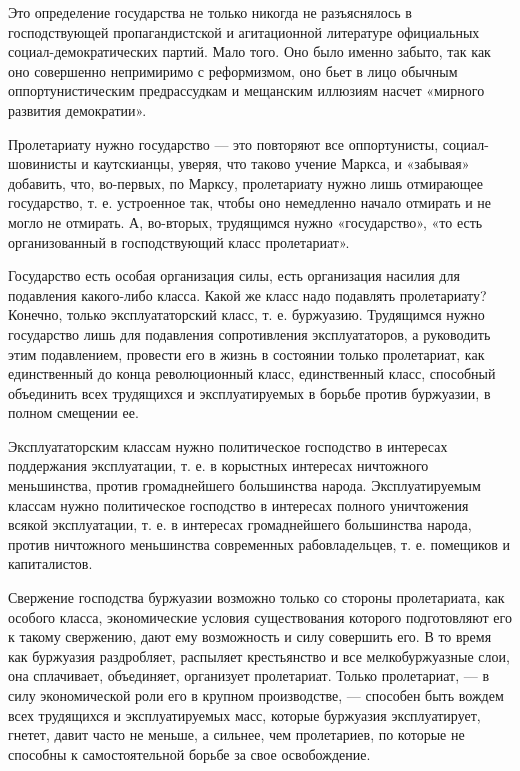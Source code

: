 \documentclass[12pt]{article}
\newcommand{\parnum}{(\arabic{parcount})}
\newcounter{parcount}
\newenvironment{parnumbers}{%
  \par%
  \everypar{\noindent \stepcounter{parcount}\marginpar[]{\parnum}}%
}{}
\begin{document}
\begin{parnumbers}
Это определение государства не только никогда не разъяснялось в господствующей пропагандистской и агитационной литературе официальных социал-демократических партий. Мало того. Оно было именно забыто, так как оно совершенно непримиримо с реформизмом, оно бьет в лицо обычным оппортунистическим предрассудкам и мещанским иллюзиям насчет «мирного развития демократии».

Пролетариату нужно государство — это повторяют все оппортунисты, социал-шовинисты и каутскианцы, уверяя, что таково учение Маркса, и «забывая» добавить, что, во-первых, по Марксу, пролетариату нужно лишь отмирающее государство, т. е. устроенное так, чтобы оно немедленно начало отмирать и не могло не отмирать. А, во-вторых, трудящимся нужно «государство», «то есть организованный в господствующий класс пролетариат».

Государство есть особая организация силы, есть организация насилия для подавления какого-либо класса. Какой же класс надо подавлять пролетариату? Конечно, только эксплуататорский класс, т. е. буржуазию. Трудящимся нужно государство лишь для подавления сопротивления эксплуататоров, а руководить этим подавлением, провести его в жизнь в состоянии только пролетариат, как единственный до конца революционный класс, единственный класс, способный объединить всех трудящихся и эксплуатируемых в борьбе против буржуазии, в полном смещении ее.

Эксплуататорским классам нужно политическое господство в интересах поддержания эксплуатации, т. е. в корыстных интересах ничтожного меньшинства, против громаднейшего большинства народа. Эксплуатируемым классам нужно политическое господство в интересах полного уничтожения всякой эксплуатации, т. е. в интересах громаднейшего большинства народа, против ничтожного меньшинства современных рабовладельцев, т. е. помещиков и капиталистов.

Свержение господства буржуазии возможно только со стороны пролетариата, как особого класса, экономические условия существования которого подготовляют его к такому свержению, дают ему возможность и силу совершить его. В то время как буржуазия раздробляет, распыляет крестьянство и все мелкобуржуазные слои, она сплачивает, объединяет, организует пролетариат. Только пролетариат, — в силу экономической роли его в крупном производстве, — способен быть вождем всех трудящихся и эксплуатируемых масс, которые буржуазия эксплуатирует, гнетет, давит часто не меньше, а сильнее, чем пролетариев, по которые не способны к самостоятельной борьбе за свое освобождение.


\end{parnumbers}
\end{document}
